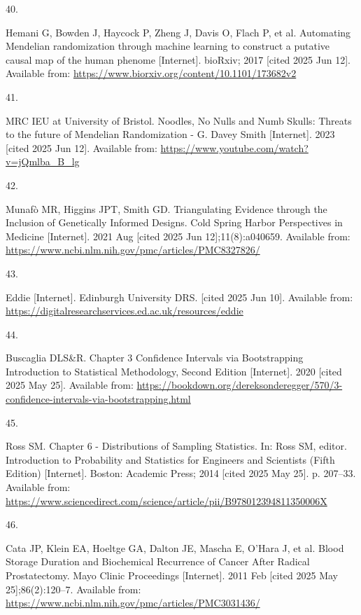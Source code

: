 \documentclass[
]{article}
\newlength{\cslhangindent}
\newlength{\csllabelwidth}
\newenvironment{CSLReferences}[2] %
 {\begin{list}{}{%
  \setlength{\itemindent}{0pt}
  \setlength{\leftmargin}{0pt}
  \setlength{\parsep}{0pt}
  \ifodd #1
   \setlength{\leftmargin}{\cslhangindent}
   \setlength{\itemindent}{-1\cslhangindent}
  \fi
  \setlength{\itemsep}{#2\baselineskip}}}
 {\end{list}}
\newcommand{\CSLLeftMargin}[1]{\parbox[t]{\csllabelwidth}{\strut#1\strut}}
\newcommand{\CSLRightInline}[1]{\parbox[t]{\linewidth - \csllabelwidth}{\strut#1\strut}}
\begin{document}
\begin{CSLReferences}{0}{1}
\CSLLeftMargin{40. }%
\CSLRightInline{Hemani G, Bowden J, Haycock P, Zheng J, Davis O, Flach P, et al. Automating {Mendelian} randomization through machine learning to construct a putative causal map of the human phenome {[}Internet{]}. bioRxiv; 2017 {[}cited 2025 Jun 12{]}. Available from: \url{https://www.biorxiv.org/content/10.1101/173682v2}}

\CSLLeftMargin{41. }%
\CSLRightInline{MRC IEU at University of Bristol. Noodles, {No} {Nulls} and {Numb} {Skulls}: {Threats} to the future of {Mendelian} {Randomization} - {G}. {Davey} {Smith} {[}Internet{]}. 2023 {[}cited 2025 Jun 12{]}. Available from: \url{https://www.youtube.com/watch?v=jQmlba_B_lg}}

\CSLLeftMargin{42. }%
\CSLRightInline{Munafò MR, Higgins JPT, Smith GD. Triangulating {Evidence} through the {Inclusion} of {Genetically} {Informed} {Designs}. Cold Spring Harbor Perspectives in Medicine {[}Internet{]}. 2021 Aug {[}cited 2025 Jun 12{]};11(8):a040659. Available from: \url{https://www.ncbi.nlm.nih.gov/pmc/articles/PMC8327826/}}

\CSLLeftMargin{43. }%
\CSLRightInline{Eddie {[}Internet{]}. Edinburgh University DRS. {[}cited 2025 Jun 10{]}. Available from: \url{https://digitalresearchservices.ed.ac.uk/resources/eddie}}

\CSLLeftMargin{44. }%
\CSLRightInline{Buscaglia DLS\&R. Chapter 3 {Confidence} {Intervals} via {Bootstrapping} {\textbar} {Introduction} to {Statistical} {Methodology}, {Second} {Edition} {[}Internet{]}. 2020 {[}cited 2025 May 25{]}. Available from: \url{https://bookdown.org/dereksonderegger/570/3-confidence-intervals-via-bootstrapping.html}}

\CSLLeftMargin{45. }%
\CSLRightInline{Ross SM. Chapter 6 - {Distributions} of {Sampling} {Statistics}. In: Ross SM, editor. Introduction to {Probability} and {Statistics} for {Engineers} and {Scientists} ({Fifth} {Edition}) {[}Internet{]}. Boston: Academic Press; 2014 {[}cited 2025 May 25{]}. p. 207--33. Available from: \url{https://www.sciencedirect.com/science/article/pii/B978012394811350006X}}

\CSLLeftMargin{46. }%
\CSLRightInline{Cata JP, Klein EA, Hoeltge GA, Dalton JE, Mascha E, O'Hara J, et al. Blood {Storage} {Duration} and {Biochemical} {Recurrence} of {Cancer} {After} {Radical} {Prostatectomy}. Mayo Clinic Proceedings {[}Internet{]}. 2011 Feb {[}cited 2025 May 25{]};86(2):120--7. Available from: \url{https://www.ncbi.nlm.nih.gov/pmc/articles/PMC3031436/}}


\end{CSLReferences}
\end{document}

